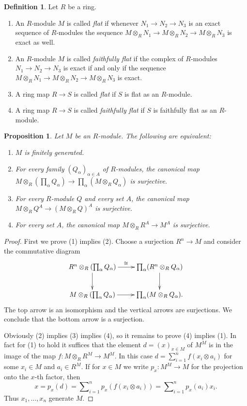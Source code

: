 \documentclass{amsart}
\theoremstyle{plain}
\newtheorem{proposition}[subsection]{Proposition}
\theoremstyle{definition}
\newtheorem{definition}[subsection]{Definition}
\theoremstyle{remark}
\numberwithin{equation}{subsection}
\begin{document}
\begin{definition}
\label{definition-flat}
Let $R$ be a ring.
\begin{enumerate}
\item An $R$-module $M$ is called {\it flat} if whenever
$N_1 \to N_2 \to N_3$ is an exact sequence of $R$-modules
the sequence $M \otimes_R N_1 \to M \otimes_R N_2 \to M \otimes_R N_3$
is exact as well.
\item An $R$-module $M$ is called {\it faithfully flat} if the
complex of $R$-modules
$N_1 \to N_2 \to N_3$ is exact if and only if
the sequence $M \otimes_R N_1 \to M \otimes_R N_2 \to M \otimes_R N_3$
is exact.
\item A ring map $R \to S$ is called {\it flat} if
$S$ is flat as an $R$-module.
\item A ring map $R \to S$ is called {\it faithfully flat} if
$S$ is faithfully flat as an $R$-module.
\end{enumerate}
\end{definition}

\begin{proposition}
\label{proposition-fg-tensor}
Let $M$ be an $R$-module.  The following are equivalent:
\begin{enumerate}
\item $M$ is finitely generated.
\item For every family $(Q_{\alpha})_{\alpha \in A}$ of $R$-modules, the
canonical map $M \otimes_R \left( \prod_{\alpha} Q_{\alpha} \right)
\to \prod_{\alpha} (M \otimes_R Q_{\alpha})$ is surjective.
\item For every $R$-module $Q$ and every set $A$, the canonical map $M
\otimes_R Q^{A} \to (M \otimes_R Q)^{A}$ is surjective.
\item For every set $A$, the canonical map $M \otimes_R R^{A} \to
M^{A}$ is surjective.
\end{enumerate}
\end{proposition}

\begin{proof}
First we prove (1) implies (2).  Choose a surjection $R^n \to M$ and
consider the commutative diagram
$$
\xymatrix{
R^n \otimes_R (\prod_{\alpha} Q_{\alpha})  \ar[r]^{\cong} \ar[d] &
\prod_{\alpha} (R^n \otimes_R Q_{\alpha}) \ar[d] \\
M \otimes_R (\prod_{\alpha} Q_{\alpha})  \ar[r] & \prod_{\alpha} ( M
\otimes_R Q_{\alpha}).
}
$$
The top arrow is an isomorphism and the vertical arrows are surjections.  We
conclude that the bottom arrow is a surjection.

\medskip\noindent
Obviously (2) implies (3) implies (4), so it remains to prove (4) implies (1).
In fact for (1) to hold it suffices that the element $d = (x)_{x \in M}$ of
$M^M$ is in the image of the map $f: M \otimes_R R^{M} \to M^M$.  In
this case $d = \sum_{i = 1}^{n} f(x_i \otimes a_i)$ for some $x_i \in M$ and
$a_i \in R^M$.  If for $x \in M$ we write $p_x: M^M \to M$ for the
projection onto the $x$-th factor, then
$$
x = p_x(d) = \sum\nolimits_{i = 1}^{n} p_x(f(x_i \otimes a_i)) =
\sum\nolimits_{i=1}^{n} p_x(a_i) x_i.
$$
Thus $x_1, \ldots, x_n$ generate $M$.
\end{proof}
\end{document}
